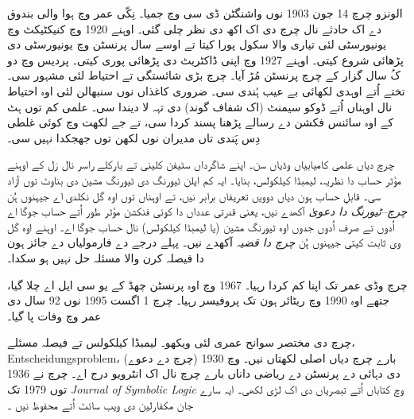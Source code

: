 \documentclass[../../../include/open-logic-section]{subfiles}
\begin{document}



الونزو چرچ 14 جون 1903 نوں واشنگٹن ڈی سی وچ جمیا۔ نِکّی عمر وچ ہوا والی بندوق دے اک حادثے نال چرچ دی اک اکھ دی نظر چلی گئی۔ اوہنے 1920 وچ کنیکٹیکٹ وچ یونیورسٹی لئی تیاری والا سکول پورا کیتا تے اوسے سال پرنسٹن وچ یونیورسٹی دی پڑھائی شروع کیتی۔ اوہنے 1927 وچ اپنی ڈاکٹریٹ دی پڑھائی پوری کیتی۔ پردیس وچ دو کُ سال گزار کے چرچ پرنسٹن مُڑ آیا۔ چرچ بڑی شائستگی تے احتیاط لئی مشہور سی۔ تختے اُتے اوہدی لکھائی بے عیب ہُندی سی۔ ضروری کاغذاں نوں سنبھالن لئی اوہ احتیاط نال اوہناں اُتے ڈوکو سیمنٹ (اک شفاف گوند) دی تہہ لا دیندا سی۔ علمی کم توں ہٹ کے اوہ سائنس فکشن دے رسالے پڑھنا پسند کردا سی، تے جے لکھت وچ کوئی غلطی دِس پَندی تاں مدیران نوں لکھن توں جھجکدا نہیں سی۔

چرچ دیاں علمی کامیابیاں وڈیاں سن۔ اپنے شاگرداں سٹیفن کلینی تے بارکلے راسر نال رَل کے اوہنے مؤثر حساب دا نظریہ، لیمبڈا کیلکولس، بنایا۔ ایہ کم ایلن ٹیورنگ دی ٹیورنگ مشین دی بناوٹ توں آزاد سی۔ قابلِ حساب ہون دیاں دوویں تعریفاں برابر نیں، تے اوہناں توں اوہ گل نکلدی اے جیہنوں ہُن \emph{چرچ–ٹیورنگ دا دعویٰ} آکھدے نیں، یعنی قدرتی عدداں دا کوئی فنکشن مؤثر طور اُتے حساب جوگا اے اُدوں تے صرف اُدوں جدوں اوہ ٹیورنگ مشین (یا لیمبڈا کیلکولس) نال حساب جوگا اے۔ اوہنے اوہ گل وی ثابت کیتی جیہنوں ہُن \emph{چرچ دا قضیہ} آکھدے نیں۔ پہلے درجے دے فارمولیاں دے جائز ہون دا فیصلہ کرن والا مسئلہ حل نہیں ہو سکدا۔

چرچ وڈی عمر تک اپنا کم کردا رہیا۔ 1967 وچ اوہ پرنسٹن چھڈ کے یو سی ایل اے چلا گیا، جتھے اوہ 1990 وچ ریٹائر ہون تک پروفیسر رہیا۔ چرچ 1 اگست 1995 نوں 92 سال دی عمر وچ وفات پا گیا۔

\begin{reading}
چرچ دی مختصر سوانح عمری لئی \citet{EndertonND} ویکھو۔ لیمبڈا کیلکولس تے فیصلہ مسئلے، Entscheidungsproblem، (چرچ دے دعوے) بارے چرچ دیاں اصلی لکھتاں \citet{Church1936,Church1936a} نیں۔ \citet{Aspray1984} وچ 1930 دی دہائی دے پرنسٹن دے ریاضی داناں بارے چرچ نال اک انٹرویو درج اے۔ چرچ نے 1936 توں 1979 تک \emph{Journal of
Symbolic Logic} وچ کتاباں اُتے تبصریاں دی اک لڑی لکھی۔ ایہ سارے جان مکفارلین دی ویب سائٹ اُتے محفوظ نیں \citep{MacFarlane2015}۔
\end{reading}
\end{document}
